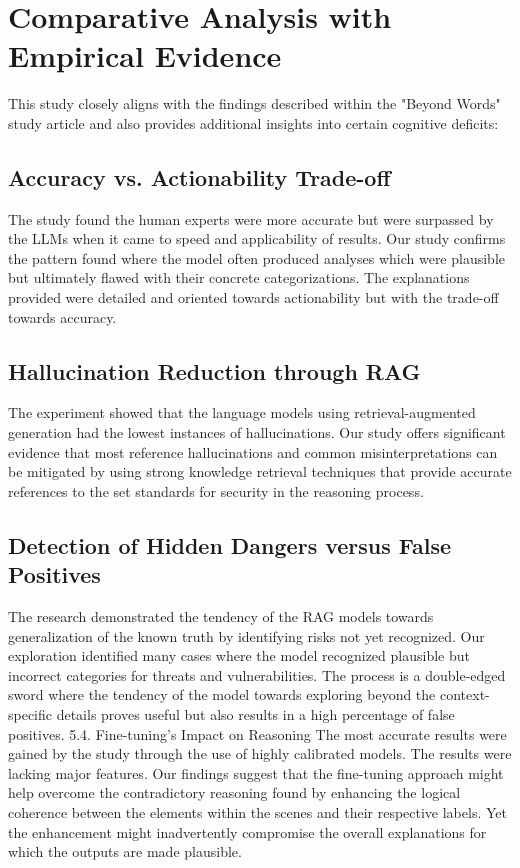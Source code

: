 \documentclass[sigconf]{acmart}
\begin{document}
\section{Comparative Analysis with Empirical Evidence}
This study closely aligns with the findings described within the "Beyond Words" study article and also provides additional insights into certain cognitive deficits:

\subsection{Accuracy vs. Actionability Trade-off}
The study found the human experts were more accurate but were surpassed by the LLMs when it came to speed and applicability of results. Our study confirms the pattern found where the model often produced analyses which were plausible but ultimately flawed with their concrete categorizations. The explanations provided were detailed and oriented towards actionability but with the trade-off towards accuracy.

\subsection{Hallucination Reduction through RAG}
The experiment showed that the language models using retrieval-augmented generation had the lowest instances of hallucinations. Our study offers significant evidence that most reference hallucinations and common misinterpretations can be mitigated by using strong knowledge retrieval techniques that provide accurate references to the set standards for security in the reasoning process.

\subsection{Detection of Hidden Dangers versus False Positives}
The research demonstrated the tendency of the RAG models towards generalization of the known truth by identifying risks not yet recognized. Our exploration identified many cases where the model recognized plausible but incorrect categories for threats and vulnerabilities. The process is a double-edged sword where the tendency of the model towards exploring beyond the context-specific details proves useful but also results in a high percentage of false positives. 5.4. Fine-tuning's Impact on Reasoning The most accurate results were gained by the study through the use of highly calibrated models. The results were lacking major features. Our findings suggest that the fine-tuning approach might help overcome the contradictory reasoning found by enhancing the logical coherence between the elements within the scenes and their respective labels. Yet the enhancement might inadvertently compromise the overall explanations for which the outputs are made plausible.
\end{document}
